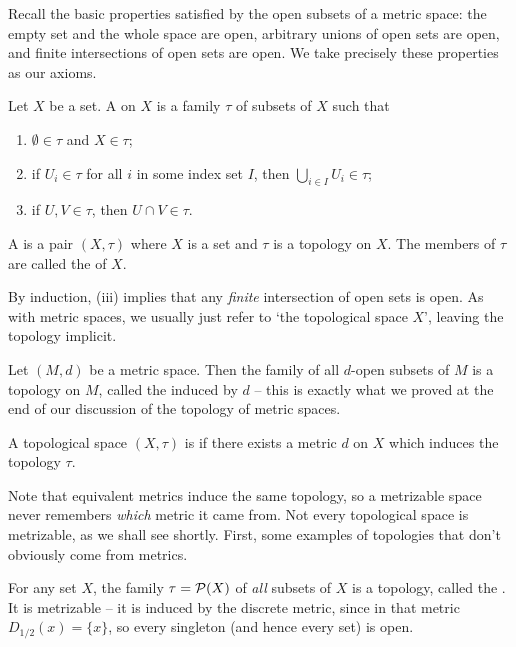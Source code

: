 \documentclass[a4paper]{scrartcl}
\begin{document}
Recall the basic properties satisfied by the open subsets of a metric space: the empty set and the whole space are open, arbitrary unions of open sets are open, and finite intersections of open sets are open. We take precisely these properties as our axioms.

\begin{definition}[Topology]
    Let $X$ be a set. A  on $X$ is a family $\tau$ of subsets of $X$ such that
    \begin{enumerate}[label=(\roman*)]
        \item $\emptyset \in \tau$ and $X \in \tau$;
        \item if $U_i \in \tau$ for all $i$ in some index set $I$, then $\bigcup_{i \in I} U_i \in \tau$;
        \item if $U, V \in \tau$, then $U \cap V \in \tau$.
    \end{enumerate}
    A  is a pair $(X, \tau)$ where $X$ is a set and $\tau$ is a topology on $X$. The members of $\tau$ are called the  of $X$.
\end{definition}

By induction, (iii) implies that any \emph{finite} intersection of open sets is open. As with metric spaces, we usually just refer to `the topological space $X$', leaving the topology implicit.

\begin{example}
    Let $(M, d)$ be a metric space. Then the family of all $d$-open subsets of $M$ is a topology on $M$, called the  induced by $d$ -- this is exactly what we proved at the end of our discussion of the topology of metric spaces.
\end{example}

\begin{definition}[Metrizable]
    A topological space $(X, \tau)$ is  if there exists a metric $d$ on $X$ which induces the topology $\tau$.
\end{definition}

Note that equivalent metrics induce the same topology, so a metrizable space never remembers \emph{which} metric it came from. Not every topological space is metrizable, as we shall see shortly. First, some examples of topologies that don't obviously come from metrics.

\begin{example}
    For any set $X$, the family $\tau = \mathcal{P}(X)$ of \emph{all} subsets of $X$ is a topology, called the . It is metrizable -- it is induced by the discrete metric, since in that metric $D_{1/2}(x) = \{x\}$, so every singleton (and hence every set) is open.
\end{example}
\end{document}
